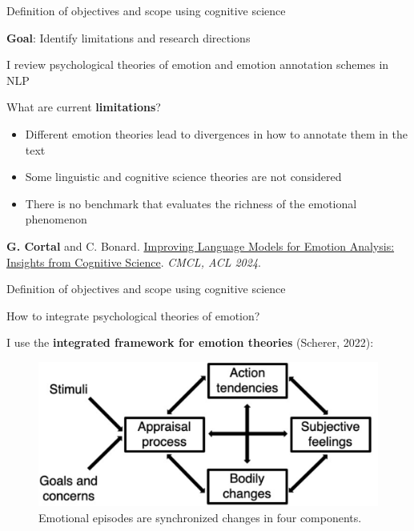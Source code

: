 \documentclass[handout,10pt]{beamer}
\begin{document}
\begin{frame}{Definition of objectives and scope using cognitive science}

\textbf{Goal}: Identify limitations and research directions

\pause
\vspace{0.5cm}

I review psychological theories of emotion and emotion annotation schemes in NLP

\pause
\vspace{0.5cm}

What are current \textbf{limitations}? 

\begin{itemize}[<+->]
    \item Different emotion theories lead to divergences in how to annotate them in the text
    \item Some linguistic and cognitive science theories are not considered
    \item There is no benchmark that evaluates the richness of the emotional phenomenon
\end{itemize}


\vspace{0.5cm}

\scriptsize

\textbf{G. Cortal} and C. Bonard. \href{https://aclanthology.org/2024.cmcl-1.23/}{Improving Language Models for Emotion Analysis: Insights from Cognitive Science}. \textit{CMCL, ACL 2024}.
    
\end{frame}

\begin{frame}{Definition of objectives and scope using cognitive science}

How to integrate psychological theories of emotion?

\pause
\vspace{0.5cm}

I use the \textbf{integrated framework for emotion theories} (Scherer, 2022):

\begin{figure}
    \centering
    \includegraphics[width=0.8\linewidth]{img/scherer_integrated_framework.png}
    \caption{Emotional episodes are synchronized changes in four components.}
    \label{fig:placeholder}
\end{figure}
    
\end{frame}
\end{document}
